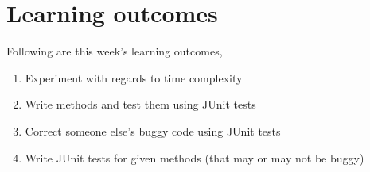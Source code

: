 \renewcommand{\labelenumi}{\alph{enumi}.}
 
\section*{Learning outcomes}
Following are this week's learning outcomes,
\begin{enumerate}
\item Experiment with regards to time complexity
\item Write methods and test them using JUnit tests
\item Correct someone else's buggy code using JUnit tests
\item Write JUnit tests for given methods (that may or may not be buggy)
\end{enumerate}

\begin{center}
\end{center}

